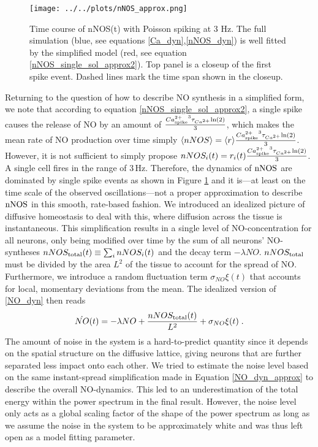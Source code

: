 \documentclass[10pt,a4paper]{article}
\begin{document}
\begin{figure}
\texttt{[image: ../../plots/nNOS\_approx.png]}
\caption{Time course of nNOS(t) with Poisson spiking at 3 Hz. The full simulation (blue, see equations \eqref{Ca_dyn},\eqref{nNOS_dyn}) is well fitted by the simplified model (red, see equation \eqref{nNOS_single_sol_approx2}). Top panel is a closeup of the first spike event. Dashed lines mark the time span shown in the closeup.}
\label{nNOS_approx_plot}
\end{figure}

Returning to the question of how to describe NO synthesis in a simplified form, we note that according to equation \eqref{nNOS_single_sol_approx2}, a single spike causes the release of NO by an amount of $\frac{{Ca^{2+}_{\rm spike}}^3 \tau_{Ca^{2+}}\mathrm{ln}(2)}{3}$, which makes the mean rate of NO production over time simply $\langle nNOS \rangle = \langle r \rangle \frac{{Ca^{2+}_{\rm spike}}^3 \tau_{Ca^{2+}} \mathrm{ln} (2)}{3}$. However, it is not sufficient to simply propose $nNOS_i(t) = r_i(t) \frac{{Ca^{2+}_{\rm spike}}^3 \tau_{Ca^{2+}} \mathrm{ln} (2)}{3}$. A single cell fires in the range of $\mathrm{3\,Hz}$. Therefore, the dynamics of $\rm nNOS$ are dominated by single spike events as shown in Figure \ref{nNOS_approx_plot} and it is---at least on the time scale of the observed oscillations---not a proper approximation to describe $\rm nNOS$ in this smooth, rate-based fashion.
\newpage
We introduced an idealized picture of diffusive homeostasis to deal with this, where diffusion across the tissue is instantaneous. This simplification results in a single level of NO-concentration for all neurons, only being modified over time by the sum of all neurons' NO-syntheses $nNOS_{\rm total}(t) \equiv \sum_{i} nNOS_i(t)$ and the decay term $-\lambda NO$. $nNOS_{\rm total}$ must be divided by the area $L^2$ of the tissue to account for the spread of NO. Furthermore, we introduce a random fluctuation term $\sigma_{NO} \xi(t)$ that accounts for local, momentary deviations from the mean. The idealized version of \eqref{NO_dyn} then reads
\begin{equation}
\dot{NO}(t)=-\lambda NO + \frac{nNOS_{\rm total}(t)}{L^2} + \sigma_{NO} \xi(t)\;.
\label{NO_dyn_approx}
\end{equation}
The amount of noise in the system is a hard-to-predict quantity since it depends on the spatial structure on the diffusive lattice, giving neurons that are further separated less impact onto each other. We tried to estimate the noise level based on the same instant-spread simplification made in Equation \eqref{NO_dyn_approx} to describe the overall NO-dynamics. This led to an underestimation of the total energy within the power spectrum in the final result. However, the noise level only acts as a global scaling factor of the shape of the power spectrum as long as we assume the noise in the system to be approximately white and was thus left open as a model fitting parameter.
\end{document}
